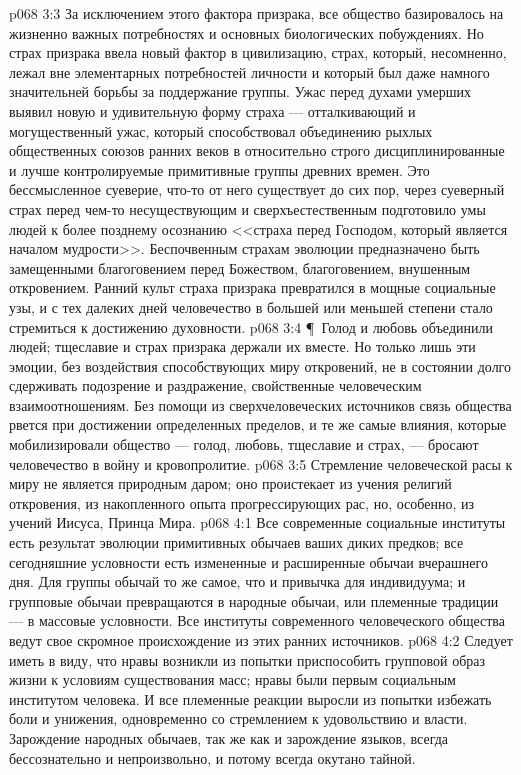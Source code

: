\vs p068 3:3 За исключением этого фактора призрака, все общество базировалось на жизненно важных потребностях и основных биологических побуждениях. Но страх призрака ввела новый фактор в цивилизацию, страх, который, несомненно, лежал вне элементарных потребностей личности и который был даже намного значительней борьбы за поддержание группы. Ужас перед духами умерших выявил новую и удивительную форму страха --- отталкивающий и могущественный ужас, который способствовал объединению рыхлых общественных союзов ранних веков в относительно строго дисциплинированные и лучше контролируемые примитивные группы древних времен. Это бессмысленное суеверие, что\hyp{}то от него существует до сих пор, через суеверный страх перед чем\hyp{}то несуществующим и сверхъестественным подготовило умы людей к более позднему осознанию <<страха перед Господом, который является началом мудрости>>. Беспочвенным страхам эволюции предназначено быть замещенными благоговением перед Божеством, благоговением, внушенным откровением. Ранний культ страха призрака превратился в мощные социальные узы, и с тех далеких дней человечество в большей или меньшей степени стало стремиться к достижению духовности.
\vs p068 3:4 \P\ Голод и любовь объединили людей; тщеславие и страх призрака держали их вместе. Но только лишь эти эмоции, без воздействия способствующих миру откровений, не в состоянии долго сдерживать подозрение и раздражение, свойственные человеческим взаимоотношениям. Без помощи из сверхчеловеческих источников связь общества рвется при достижении определенных пределов, и те же самые влияния, которые мобилизировали общество --- голод, любовь, тщеславие и страх, --- бросают человечество в войну и кровопролитие.
\vs p068 3:5 Стремление человеческой расы к миру не является природным даром; оно проистекает из учения религий откровения, из накопленного опыта прогрессирующих рас, но, особенно, из учений Иисуса, Принца Мира.
\vs p068 4:1 Все современные социальные институты есть результат эволюции примитивных обычаев ваших диких предков; все сегодняшние условности есть измененные и расширенные обычаи вчерашнего дня. Для группы обычай то же самое, что и привычка для индивидуума; и групповые обычаи превращаются в народные обычаи, или племенные традиции --- в массовые условности. Все институты современного человеческого общества ведут свое скромное происхождение из этих ранних источников.
\vs p068 4:2 Следует иметь в виду, что нравы возникли из попытки приспособить групповой образ жизни к условиям существования масс; нравы были первым социальным институтом человека. И все племенные реакции выросли из попытки избежать боли и унижения, одновременно со стремлением к удовольствию и власти. Зарождение народных обычаев, так же как и зарождение языков, всегда бессознательно и непроизвольно, и потому всегда окутано тайной.
